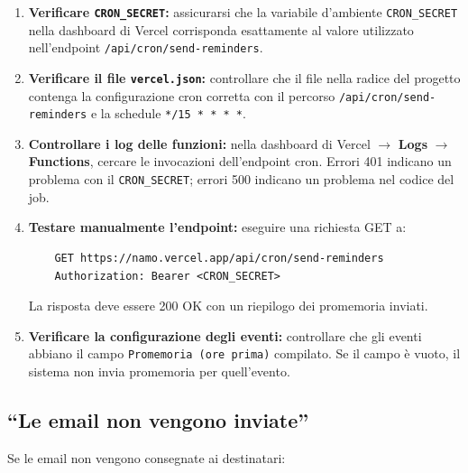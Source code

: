 \documentclass[a4paper,11pt,oneside]{book}
\newcommand{\campo}[1]{\texttt{#1}}
\begin{document}
\begin{enumerate}[leftmargin=1.5em]
  \item \textbf{Verificare \texttt{CRON\_SECRET}:} assicurarsi che la variabile d'ambiente \texttt{CRON\_SECRET} nella dashboard di Vercel corrisponda esattamente al valore utilizzato nell'endpoint \texttt{/api/cron/send-reminders}.
  \item \textbf{Verificare il file \texttt{vercel.json}:} controllare che il file nella radice del progetto contenga la configurazione cron corretta con il percorso \texttt{/api/cron/send-reminders} e la schedule \texttt{*/15 * * * *}.
  \item \textbf{Controllare i log delle funzioni:} nella dashboard di Vercel $\rightarrow$ \textbf{Logs} $\rightarrow$ \textbf{Functions}, cercare le invocazioni dell'endpoint cron. Errori 401 indicano un problema con il \texttt{CRON\_SECRET}; errori 500 indicano un problema nel codice del job.
  \item \textbf{Testare manualmente l'endpoint:} eseguire una richiesta GET a:
    \begin{verbatim}
    GET https://namo.vercel.app/api/cron/send-reminders
    Authorization: Bearer <CRON_SECRET>
    \end{verbatim}
    La risposta deve essere 200 OK con un riepilogo dei promemoria inviati.
  \item \textbf{Verificare la configurazione degli eventi:} controllare che gli eventi abbiano il campo \campo{Promemoria (ore prima)} compilato. Se il campo \`e vuoto, il sistema non invia promemoria per quell'evento.
\end{enumerate}

\subsection{``Le email non vengono inviate''}

Se le email non vengono consegnate ai destinatari:
\end{document}
